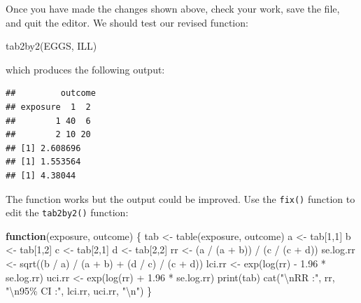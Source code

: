 \documentclass[
  12pt,
]{book}
\newenvironment{Shaded}{\begin{snugshade}}{\end{snugshade}}
\newcommand{\ControlFlowTok}[1]{\textcolor[rgb]{0.13,0.29,0.53}{\textbf{#1}}}
\newcommand{\DecValTok}[1]{\textcolor[rgb]{0.00,0.00,0.81}{#1}}
\newcommand{\FloatTok}[1]{\textcolor[rgb]{0.00,0.00,0.81}{#1}}
\newcommand{\FunctionTok}[1]{\textcolor[rgb]{0.00,0.00,0.00}{#1}}
\newcommand{\NormalTok}[1]{#1}
\newcommand{\OtherTok}[1]{\textcolor[rgb]{0.56,0.35,0.01}{#1}}
\newcommand{\SpecialCharTok}[1]{\textcolor[rgb]{0.00,0.00,0.00}{#1}}
\newcommand{\StringTok}[1]{\textcolor[rgb]{0.31,0.60,0.02}{#1}}
\begin{document}
\newpage

Once you have made the changes shown above, check your work, save the file, and quit the editor. We should test our revised function:

\begin{Shaded}
\begin{Highlighting}[]
\FunctionTok{tab2by2}\NormalTok{(EGGS, ILL)}
\end{Highlighting}
\end{Shaded}

which produces the following output:

\begin{verbatim}
##         outcome
## exposure  1  2
##        1 40  6
##        2 10 20
## [1] 2.608696
## [1] 1.553564
## [1] 4.38044
\end{verbatim}

The function works but the output could be improved. Use the \texttt{fix()} function to edit the \texttt{tab2by2()} function:

\begin{Shaded}
\begin{Highlighting}[]
\ControlFlowTok{function}\NormalTok{(exposure, outcome) \{}
\NormalTok{  tab }\OtherTok{\textless{}{-}} \FunctionTok{table}\NormalTok{(exposure, outcome)}
\NormalTok{  a }\OtherTok{\textless{}{-}}\NormalTok{ tab[}\DecValTok{1}\NormalTok{,}\DecValTok{1}\NormalTok{]}
\NormalTok{  b }\OtherTok{\textless{}{-}}\NormalTok{ tab[}\DecValTok{1}\NormalTok{,}\DecValTok{2}\NormalTok{]}
\NormalTok{  c }\OtherTok{\textless{}{-}}\NormalTok{ tab[}\DecValTok{2}\NormalTok{,}\DecValTok{1}\NormalTok{]}
\NormalTok{  d }\OtherTok{\textless{}{-}}\NormalTok{ tab[}\DecValTok{2}\NormalTok{,}\DecValTok{2}\NormalTok{]}
\NormalTok{  rr }\OtherTok{\textless{}{-}}\NormalTok{ (a }\SpecialCharTok{/}\NormalTok{ (a }\SpecialCharTok{+}\NormalTok{ b)) }\SpecialCharTok{/}\NormalTok{ (c }\SpecialCharTok{/}\NormalTok{ (c }\SpecialCharTok{+}\NormalTok{ d))}
\NormalTok{  se.log.rr }\OtherTok{\textless{}{-}} \FunctionTok{sqrt}\NormalTok{((b }\SpecialCharTok{/}\NormalTok{ a) }\SpecialCharTok{/}\NormalTok{ (a }\SpecialCharTok{+}\NormalTok{ b) }\SpecialCharTok{+}\NormalTok{ (d }\SpecialCharTok{/}\NormalTok{ c) }\SpecialCharTok{/}\NormalTok{ (c }\SpecialCharTok{+}\NormalTok{ d)) }
\NormalTok{  lci.rr }\OtherTok{\textless{}{-}} \FunctionTok{exp}\NormalTok{(}\FunctionTok{log}\NormalTok{(rr) }\SpecialCharTok{{-}} \FloatTok{1.96} \SpecialCharTok{*}\NormalTok{ se.log.rr)}
\NormalTok{  uci.rr }\OtherTok{\textless{}{-}} \FunctionTok{exp}\NormalTok{(}\FunctionTok{log}\NormalTok{(rr) }\SpecialCharTok{+} \FloatTok{1.96} \SpecialCharTok{*}\NormalTok{ se.log.rr)}
  \FunctionTok{print}\NormalTok{(tab)}
  \FunctionTok{cat}\NormalTok{(}\StringTok{"}\SpecialCharTok{\textbackslash{}n}\StringTok{RR :"}\NormalTok{, rr,}
      \StringTok{"}\SpecialCharTok{\textbackslash{}n}\StringTok{95\% CI :"}\NormalTok{, lci.rr, uci.rr, }\StringTok{"}\SpecialCharTok{\textbackslash{}n}\StringTok{"}\NormalTok{)}
\NormalTok{\}}
\end{Highlighting}
\end{Shaded}
\end{document}
